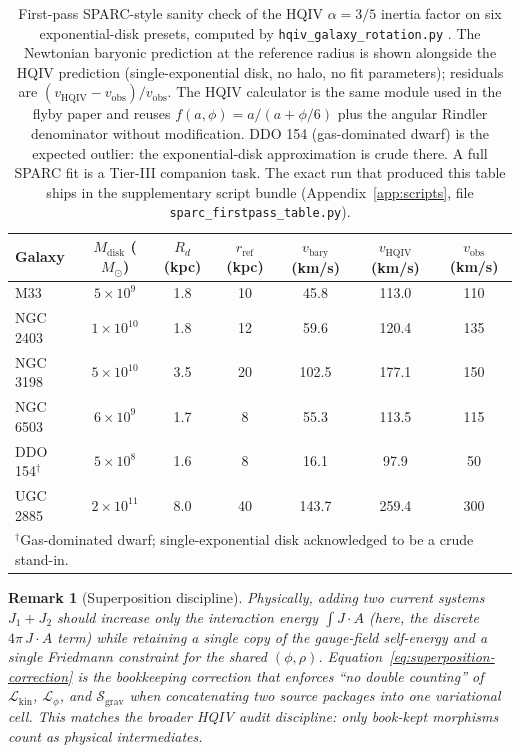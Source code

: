 \documentclass[11pt]{amsart}
\newtheorem{remark}[theorem]{Remark}
\begin{document}
\begin{table}[ht]
\centering
\renewcommand{\arraystretch}{1.18}
\caption{First-pass SPARC-style sanity check of the HQIV \(\alpha=3/5\) inertia factor on six exponential-disk presets, computed by \texttt{hqiv\_galaxy\_rotation.py} \cite{hqiv-orbital}. The Newtonian baryonic prediction at the reference radius is shown alongside the HQIV prediction (single-exponential disk, no halo, no fit parameters); residuals are \((v_{\mathrm{HQIV}}-v_{\mathrm{obs}})/v_{\mathrm{obs}}\). The HQIV calculator is the same module used in the flyby paper and reuses \(f(a,\phi)=a/(a+\phi/6)\) plus the angular Rindler denominator without modification. DDO 154 (gas-dominated dwarf) is the expected outlier: the exponential-disk approximation is crude there. A full SPARC fit is a Tier-III companion task. The exact run that produced this table ships in the supplementary script bundle (Appendix~\ref{app:scripts}, file \texttt{sparc\_firstpass\_table.py}).}
\label{tab:sparc-firstpass}
\begin{tabular}{lcccccc}
\hline
Galaxy & \(M_\mathrm{disk}\) (\(M_\odot\)) & \(R_d\) (kpc) & \(r_{\mathrm{ref}}\) (kpc) & \(v_\mathrm{bary}\) (km/s) & \(v_\mathrm{HQIV}\) (km/s) & \(v_\mathrm{obs}\) (km/s) \\
\hline
M33      & \(5{\times}10^{9}\)   & 1.8 & 10 & 45.8  & 113.0 & 110 \\
NGC 2403 & \(1{\times}10^{10}\)  & 1.8 & 12 & 59.6  & 120.4 & 135 \\
NGC 3198 & \(5{\times}10^{10}\)  & 3.5 & 20 & 102.5 & 177.1 & 150 \\
NGC 6503 & \(6{\times}10^{9}\)   & 1.7 & 8  & 55.3  & 113.5 & 115 \\
DDO 154\(^{\dagger}\) & \(5{\times}10^{8}\) & 1.6 & 8  & 16.1  & 97.9  & 50  \\
UGC 2885 & \(2{\times}10^{11}\)  & 8.0 & 40 & 143.7 & 259.4 & 300 \\
\hline
\multicolumn{7}{l}{\footnotesize\(^{\dagger}\)Gas-dominated dwarf; single-exponential disk acknowledged to be a crude stand-in.}
\end{tabular}
\end{table}

\begin{remark}[Superposition discipline]
\label{rem:superposition}
Physically, adding two current systems \(J_1+J_2\) should increase only the interaction energy \(\int J\!\cdot\!A\) (here, the discrete \(4\pi\,J\!\cdot\!A\) term) while retaining a \emph{single} copy of the gauge-field self-energy and a \emph{single} Friedmann constraint for the shared \((\phi,\rho)\). Equation~\eqref{eq:superposition-correction} is the bookkeeping correction that enforces ``no double counting'' of \(\mathcal{L}_{\mathrm{kin}}\), \(\mathcal{L}_\phi\), and \(\mathcal{S}_{\mathrm{grav}}\) when concatenating two source packages into one variational cell. This matches the broader HQIV audit discipline: only book-kept morphisms count as physical intermediates.
\end{remark}
\end{document}
